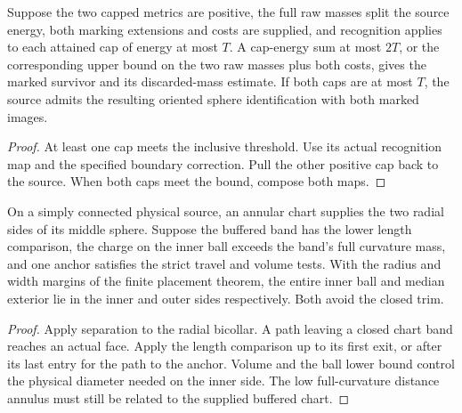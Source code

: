 \begin{proposition}
\label{prop:ed03-inclusive-caps}
\leanok
Suppose the two capped metrics are positive, the full raw masses split
the source energy, both marking extensions and costs are supplied, and
recognition applies to each attained cap of energy at most \(T\).
A cap-energy sum at most \(2T\), or the corresponding upper bound on
the two raw masses plus both costs, gives the marked survivor and its
discarded-mass estimate. If both caps are at most \(T\), the source
admits the resulting oriented sphere identification with both marked images.
\end{proposition}
\begin{proof}
\leanok
At least one cap meets the inclusive threshold. Use its actual recognition
map and the specified boundary correction. Pull the other positive cap
back to the source. When both caps meet the bound, compose both maps.
\end{proof}

\begin{proposition}
\label{prop:ed03-anchored-shell}
\leanok
On a simply connected physical source, an annular chart supplies the
two radial sides of its middle sphere. Suppose the buffered band has
the lower length comparison, the charge on the inner ball exceeds the
band's full curvature mass, and one anchor satisfies the strict travel
and volume tests. With the radius and width margins of the finite
placement theorem, the entire inner ball and median exterior lie in the
inner and outer sides respectively. Both avoid the closed trim.
\end{proposition}
\begin{proof}
\leanok
Apply separation to the radial bicollar. A path leaving a closed chart
band reaches an actual face. Apply the length comparison up to its
first exit, or after its last entry for the path to the anchor.
Volume and the ball lower bound control the physical diameter needed
on the inner side. The low full-curvature distance annulus must still
be related to the supplied buffered chart.
\end{proof}

